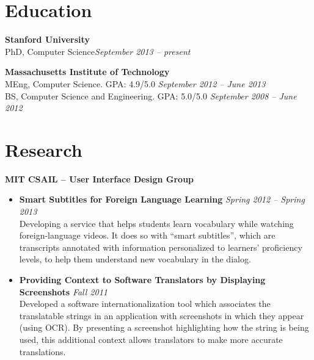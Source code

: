 \documentclass[margin,line]{resume}
\begin{document}
\vspace{-5.0mm}

\begin{resume}

\section{\mysidestyle Education}

\textbf{Stanford University} \vspace{0mm}\\\vspace{0mm}%
PhD, Computer Science\hfill \textsl{September 2013 -- present}

\textbf{Massachusetts Institute of Technology} \vspace{0mm}\\\vspace{0mm}%
MEng, Computer Science. GPA: 4.9/5.0 \hfill \textsl{September 2012 -- June 2013}\\\vspace{1mm}%
BS, Computer Science and Engineering. GPA: 5.0/5.0 \hfill \textsl{September 2008 -- June 2012}\vspace{-0.8mm}

\vspace{-0.5mm}

\section{\mysidestyle Research}

\textbf{MIT CSAIL -- User Interface Design Group}
\begin{itemize}
\item \textbf{Smart Subtitles for Foreign Language Learning}  \hfill \textsl{Spring 2012 -- Spring 2013} \\
Developing a service that helps students learn vocabulary while watching foreign-language videos.
It does so with ``smart subtitles'', which are transcripts annotated with information personalized to learners' proficiency levels, to help them understand new vocabulary in the dialog. %
\item \textbf{Providing Context to Software Translators by Displaying Screenshots}  \hfill \textsl{Fall 2011}\\
Developed a software internationalization tool which associates the translatable strings in an application with screenshots in which they appear (using OCR). By presenting a screenshot highlighting how the string is being used, this additional context allows translators to make more accurate translations.
\end{itemize}


\end{resume}
\end{document}
